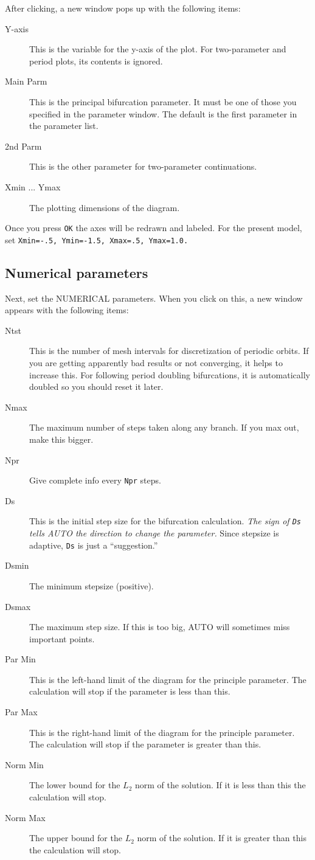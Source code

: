 \documentclass{article}
\begin{document}
After clicking, a new window pops up with the following items:
\begin{description}
\item[Y-axis] This is the variable for the y-axis of the plot.  For
two-parameter and period plots, its contents is ignored.
\item[Main Parm] This is the principal bifurcation parameter.  It must
be one of those you specified in the parameter window.  The default is
the first parameter in the parameter list.
\item[2nd Parm] This is the other parameter for two-parameter
continuations.
\item[Xmin ... Ymax] The plotting dimensions of the diagram.
\end{description}

Once you press {\tt OK} the axes will be redrawn and labeled.
For the present model, set {\tt Xmin=-.5, Ymin=-1.5, Xmax=.5,
Ymax=1.0.}
\subsection{Numerical parameters}

Next, set the NUMERICAL parameters.  When you click on this, a new
window appears with the following items:

\begin{description}
\item[Ntst] This is the number of mesh intervals for discretization
of periodic orbits.
If you are getting apparently bad results or not converging, it helps
to increase this.  For following period doubling bifurcations, it is
automatically doubled so you should reset it later.
\item[Nmax] The maximum number of steps taken along any branch.  If
you max out, make this bigger.
\item[Npr] Give complete info every {\tt Npr} steps.
\item[Ds] This is the initial step size for the bifurcation
calculation. {\em The sign of {\tt Ds} tells AUTO the direction to
change the parameter.} Since stepsize is adaptive, {\tt Ds} is just a
``suggestion.''
\item[Dsmin] The minimum stepsize (positive).
\item[Dsmax] The maximum step size.  If this is too big, AUTO will
sometimes miss important points. 
\item[Par Min] This is the left-hand limit of the diagram for the
principle parameter. The calculation will stop if the parameter is
less than this.
\item[Par Max] This is the right-hand limit of the diagram for the
principle parameter. The calculation will stop if the parameter is
greater than this.
\item[Norm Min] The lower bound for the $L_2$ norm of the solution.  If it
is less than this the calculation will stop.
\item[Norm Max] The upper bound for the $L_2$ norm of the solution.  If it
is greater than this the calculation will stop.
\end{description}
\end{document}
